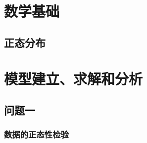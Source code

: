 \documentclass[UTF8]{ctexart}
\begin{document}
	\section{数学基础}
	\subsection{正态分布}
	
	\section{模型建立、求解和分析}
	\subsection{问题一}
	\subsubsection{数据的正态性检验}
\end{document}
